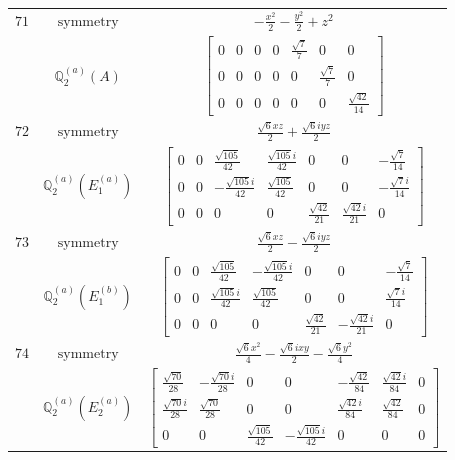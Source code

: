 \documentclass[fleqn,8pt,landscape]{jsarticle}
\begin{document}
\begin{longtable}{ccc}
$ 71 $ & $ \text{symmetry} $ & $ - \frac{x^{2}}{2} - \frac{y^{2}}{2} + z^{2} $ \\
$  $ & $ \mathbb{Q}_{2}^{(a)}(A) $ & $ \begin{bmatrix} 0 & 0 & 0 & 0 & \frac{\sqrt{7}}{7} & 0 & 0 \\ 0 & 0 & 0 & 0 & 0 & \frac{\sqrt{7}}{7} & 0 \\ 0 & 0 & 0 & 0 & 0 & 0 & \frac{\sqrt{42}}{14} \end{bmatrix} $ \\ \hline
$ 72 $ & $ \text{symmetry} $ & $ \frac{\sqrt{6} x z}{2} + \frac{\sqrt{6} i y z}{2} $ \\
$  $ & $ \mathbb{Q}_{2}^{(a)}(E_{1}^{(a)}) $ & $ \begin{bmatrix} 0 & 0 & \frac{\sqrt{105}}{42} & \frac{\sqrt{105} i}{42} & 0 & 0 & - \frac{\sqrt{7}}{14} \\ 0 & 0 & - \frac{\sqrt{105} i}{42} & \frac{\sqrt{105}}{42} & 0 & 0 & - \frac{\sqrt{7} i}{14} \\ 0 & 0 & 0 & 0 & \frac{\sqrt{42}}{21} & \frac{\sqrt{42} i}{21} & 0 \end{bmatrix} $ \\ \hline
$ 73 $ & $ \text{symmetry} $ & $ \frac{\sqrt{6} x z}{2} - \frac{\sqrt{6} i y z}{2} $ \\
$  $ & $ \mathbb{Q}_{2}^{(a)}(E_{1}^{(b)}) $ & $ \begin{bmatrix} 0 & 0 & \frac{\sqrt{105}}{42} & - \frac{\sqrt{105} i}{42} & 0 & 0 & - \frac{\sqrt{7}}{14} \\ 0 & 0 & \frac{\sqrt{105} i}{42} & \frac{\sqrt{105}}{42} & 0 & 0 & \frac{\sqrt{7} i}{14} \\ 0 & 0 & 0 & 0 & \frac{\sqrt{42}}{21} & - \frac{\sqrt{42} i}{21} & 0 \end{bmatrix} $ \\ \hline
$ 74 $ & $ \text{symmetry} $ & $ \frac{\sqrt{6} x^{2}}{4} - \frac{\sqrt{6} i x y}{2} - \frac{\sqrt{6} y^{2}}{4} $ \\
$  $ & $ \mathbb{Q}_{2}^{(a)}(E_{2}^{(a)}) $ & $ \begin{bmatrix} \frac{\sqrt{70}}{28} & - \frac{\sqrt{70} i}{28} & 0 & 0 & - \frac{\sqrt{42}}{84} & \frac{\sqrt{42} i}{84} & 0 \\ \frac{\sqrt{70} i}{28} & \frac{\sqrt{70}}{28} & 0 & 0 & \frac{\sqrt{42} i}{84} & \frac{\sqrt{42}}{84} & 0 \\ 0 & 0 & \frac{\sqrt{105}}{42} & - \frac{\sqrt{105} i}{42} & 0 & 0 & 0 \end{bmatrix} $ \\ \hline

\end{longtable}
\end{document}
